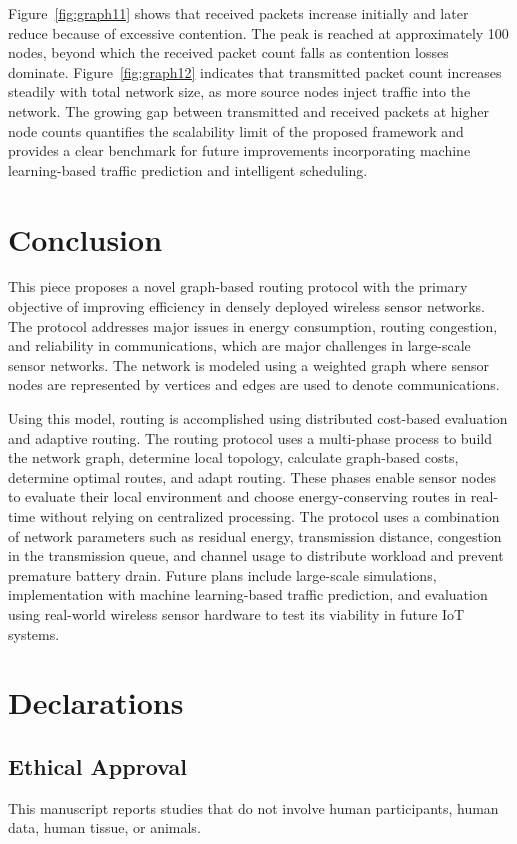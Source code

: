\documentclass[a4paper,fleqn]{cas-dc}
\numberwithin{equation}{section}
\begin{document}
Figure~\ref{fig:graph11} shows that received packets increase initially and later reduce because of excessive contention. The peak is reached at approximately 100 nodes, beyond which the received packet count falls as contention losses dominate. Figure~\ref{fig:graph12} indicates that transmitted packet count increases steadily with total network size, as more source nodes inject traffic into the network. The growing gap between transmitted and received packets at higher node counts quantifies the scalability limit of the proposed framework and provides a clear benchmark for future improvements incorporating machine learning-based traffic prediction and intelligent scheduling.

\section{Conclusion}

This piece proposes a novel graph-based routing protocol with the primary objective of improving efficiency in densely deployed wireless sensor networks. The protocol addresses major issues in energy consumption, routing congestion, and reliability in communications, which are major challenges in large-scale sensor networks. The network is modeled using a weighted graph where sensor nodes are represented by vertices and edges are used to denote communications.

Using this model, routing is accomplished using distributed cost-based evaluation and adaptive routing. The routing protocol uses a multi-phase process to build the network graph, determine local topology, calculate graph-based costs, determine optimal routes, and adapt routing. These phases enable sensor nodes to evaluate their local environment and choose energy-conserving routes in real-time without relying on centralized processing. The protocol uses a combination of network parameters such as residual energy, transmission distance, congestion in the transmission queue, and channel usage to distribute workload and prevent premature battery drain. Future plans include large-scale simulations, implementation with machine learning-based traffic prediction, and evaluation using real-world wireless sensor hardware to test its viability in future IoT systems.

\section{Declarations}

\subsection{Ethical Approval}
This manuscript reports studies that do not involve human participants, human data, human tissue, or animals.
\end{document}
